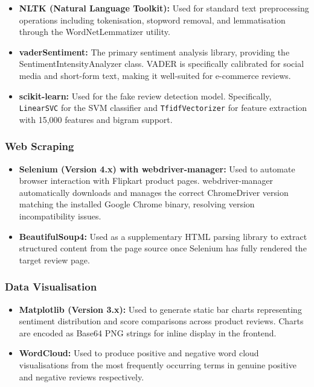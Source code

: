 \documentclass[12pt,a4paper]{report}
\begin{document}
\begin{itemize}
  \item \textbf{NLTK (Natural Language Toolkit):} Used for standard text preprocessing operations including tokenisation, stopword removal, and lemmatisation through the WordNetLemmatizer utility.

  \item \textbf{vaderSentiment:} The primary sentiment analysis library, providing the SentimentIntensityAnalyzer class. VADER is specifically calibrated for social media and short-form text, making it well-suited for e-commerce reviews.

  \item \textbf{scikit-learn:} Used for the fake review detection model. Specifically, \texttt{LinearSVC} for the SVM classifier and \texttt{TfidfVectorizer} for feature extraction with 15,000 features and bigram support.
\end{itemize}

\subsubsection*{Web Scraping}

\begin{itemize}
  \item \textbf{Selenium (Version 4.x) with webdriver-manager:} Used to automate browser interaction with Flipkart product pages. webdriver-manager automatically downloads and manages the correct ChromeDriver version matching the installed Google Chrome binary, resolving version incompatibility issues.

  \item \textbf{BeautifulSoup4:} Used as a supplementary HTML parsing library to extract structured content from the page source once Selenium has fully rendered the target review page.
\end{itemize}

\subsubsection*{Data Visualisation}

\begin{itemize}
  \item \textbf{Matplotlib (Version 3.x):} Used to generate static bar charts representing sentiment distribution and score comparisons across product reviews. Charts are encoded as Base64 PNG strings for inline display in the frontend.

  \item \textbf{WordCloud:} Used to produce positive and negative word cloud visualisations from the most frequently occurring terms in genuine positive and negative reviews respectively.
\end{itemize}
\end{document}

